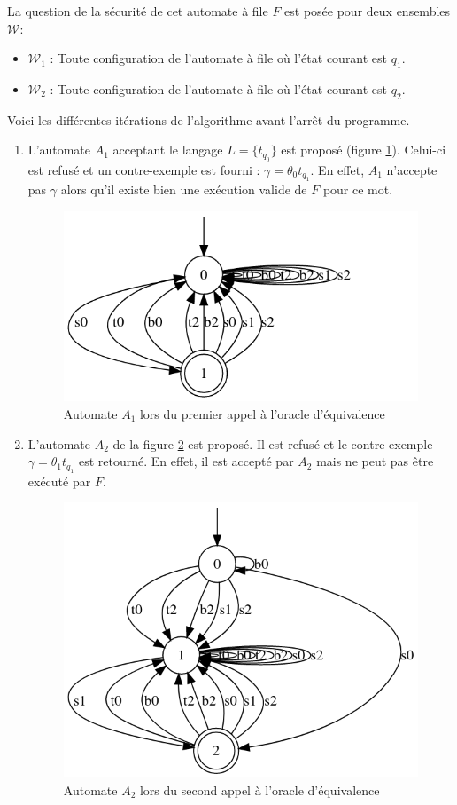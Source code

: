 La question de la sécurité de cet automate à file $F$ est posée pour deux ensembles $\mathcal{W}$:

\begin{itemize}
  \item $\mathcal{W}_1$ : Toute configuration de l'automate à file où l'état courant est $q_1$.
  \item $\mathcal{W}_2$ : Toute configuration de l'automate à file où l'état courant est $q_2$.
\end{itemize}

Voici les différentes itérations de l'algorithme avant l'arrêt du programme.

\begin{enumerate}

\item L'automate $A_1$ acceptant le langage $L=\{t_{q_0}\}$ est proposé (figure \ref{fig:fina1}). Celui-ci est refusé et un contre-exemple est fourni : $\gamma=\theta_0 t_{q_1}$. En effet, $A_1$ n'accepte pas $\gamma$ alors qu'il existe bien une exécution valide de $F$ pour ce mot.

\begin{figure}[H]
  \centering
  \includegraphics[width=0.4\linewidth]{res/minimalist_0}
  \caption{Automate $A_1$ lors du premier appel à l'oracle d'équivalence}\label{fig:fina1}
\end{figure}

\item L'automate $A_2$ de la figure \ref{fig:fina2} est proposé. Il est refusé et le contre-exemple $\gamma=\theta_1 t_{q_1}$ est retourné. En effet, il est accepté par $A_2$ mais ne peut pas être exécuté par $F$.
\begin{figure}[H]
  \centering
  \includegraphics[width=0.4\linewidth]{res/minimalist_1}
  \caption{Automate $A_2$ lors du second appel à l'oracle d'équivalence}\label{fig:fina2}
\end{figure}


\end{enumerate}
